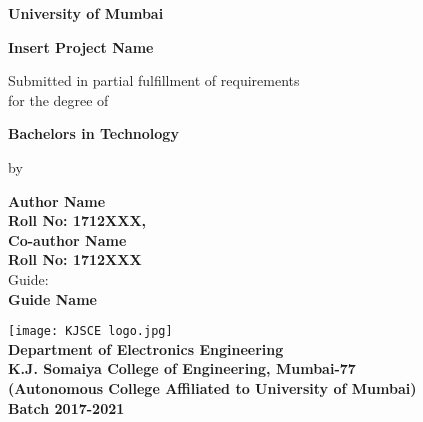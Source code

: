 \begin{titlepage}
    \begin{center}
        \vspace*{0.1cm}
          
        \LARGE
        \textbf{University of Mumbai}
        \vspace{0.5cm}
        
        \LARGE
        \textbf{Insert Project Name}
         
        \par 
        \large
        Submitted in partial fulfillment of requirements\\
        for the degree of\\
        \Large
        \par
        \textbf{Bachelors in Technology}
        
        \large
        \par
        by
        
        \Large
        \par
        \textbf{Author Name\\ Roll No: 1712XXX,\\ \vspace{0.5cm} Co-author Name\\ Roll No: 1712XXX}\\
        
        \large
        \vspace{0.5cm}
        Guide:\\
        \Large
        \textbf{Guide Name}
            
        \vfill
            
        \vspace{0.5cm}
            
        \texttt{[image: KJSCE logo.jpg]}\\
        \vspace{0.5cm}   
        \large
        \textbf{Department of Electronics Engineering}\\
        \textbf{K.J. Somaiya College of Engineering, Mumbai-77}\\
        \normalsize
        \textbf{(Autonomous College Affiliated to University of Mumbai)}\\
        \vspace{0.5cm}
        \large
        \textbf{Batch 2017-2021}\\
        \vspace{0.8cm}

    \end{center}
\end{titlepage}